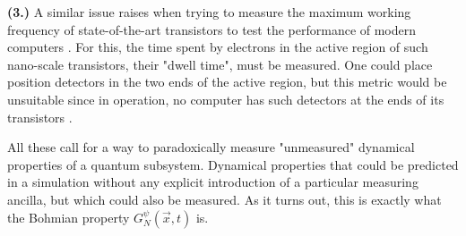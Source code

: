 \documentclass[11pt, a4paper]{article} %
\begin{document}
{\bf (3.)} A similar issue raises when trying to measure the maximum working frequency of state-of-the-art transistors to test the performance of modern computers \cite{modern}. For this, the time spent by electrons in the active region of such nano-scale transistors, their "dwell time", must be measured. One could place position detectors in the two ends of the active region, but this metric would be unsuitable since in operation, no computer has such detectors at the ends of its transistors \cite{tunnel1, tunnel2}.

All these call for a way to paradoxically measure "unmeasured" dynamical properties of a quantum subsystem. Dynamical properties that could be predicted in a simulation without any explicit introduction of a particular measuring ancilla, but which could also be measured. As it turns out, this is exactly what the Bohmian property $G^\psi_N(\vec{x},t)$ is.
\end{document}
